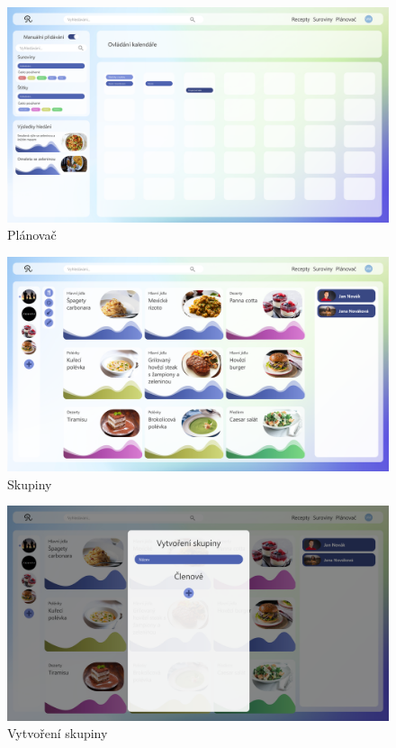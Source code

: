 \begin{figure}[H]
    \includegraphics[width=\textwidth]{pdf/adobexd/planovac}
    \caption{Plánovač} \label{picture:recipeo:navrh:planovac}
\end{figure}

\begin{figure}[H]
    \includegraphics[width=\textwidth]{pdf/adobexd/skupiny}
    \caption{Skupiny} \label{picture:recipeo:navrh:skupiny}
\end{figure}

\begin{figure}[H]
    \includegraphics[width=\textwidth]{pdf/adobexd/skupiny-vytvoreni}
    \caption{Vytvoření skupiny} \label{picture:recipeo:navrh:skupiny-vytvoreni}
\end{figure}

